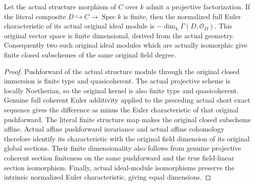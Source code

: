 \begin{theorem}
\label{thm:fc-finite-closed-ideal-euler}
\leanok
{}
Let the actual structure morphism of $C$ over $k$ admit a projective
factorization. If the literal composite $D\hookrightarrow C\to
\operatorname{Spec}k$ is finite, then the normalized full Euler
characteristic of its actual original ideal module is
$-\dim_k\Gamma(D,\mathcal O_D)$. This original vector space is finite
dimensional, derived from the actual geometry. Consequently two such
original ideal modules which are actually isomorphic give finite
closed subschemes of the same original field degree.
\end{theorem}
\begin{proof}
Pushforward of the actual structure module through the original closed
immersion is finite type and quasicoherent. The actual projective
scheme is locally Noetherian, so the original kernel is also finite
type and quasicoherent. Genuine full coherent Euler additivity applied
to the preceding actual short exact sequence gives the difference as
minus the Euler characteristic of that original pushforward. The
literal finite structure map makes the original closed subscheme
affine. Actual affine pushforward invariance and actual affine
cohomology therefore identify its characteristic with the original
field dimension of its original global sections. Their finite
dimensionality also follows from genuine projective coherent section
finiteness on the same pushforward and the true field-linear section
isomorphism. Finally, actual ideal-module isomorphisms preserve the
intrinsic normalized Euler characteristic, giving equal dimensions.
\end{proof}
